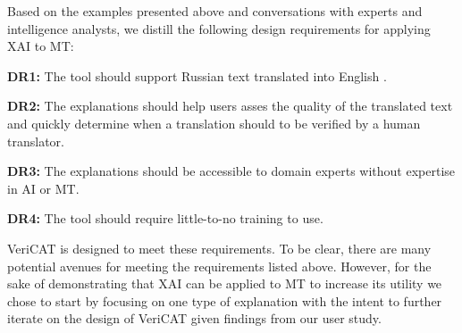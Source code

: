 Based on the examples presented above and conversations with experts and intelligence analysts, we distill the following design requirements for applying XAI to MT:  

\begin{compacthang}
\item \textbf{DR1:} The tool should support Russian text translated into English  . 

\item \textbf{DR2:} The explanations should help users asses the quality of the translated text and quickly determine when a translation should to be verified by a human translator. 

\item \textbf{DR3:} The explanations should be accessible to domain experts without expertise in AI or MT. 

\item \textbf{DR4:} The tool should require little-to-no training to use. 

\end{compacthang}


VeriCAT is designed to meet these requirements. To be clear, there are many potential avenues for meeting the requirements listed above. However, for the sake of demonstrating that XAI can be applied to MT to increase its utility we chose to start by focusing on one type of explanation with the intent to further iterate on the design of VeriCAT given findings from our user study.    